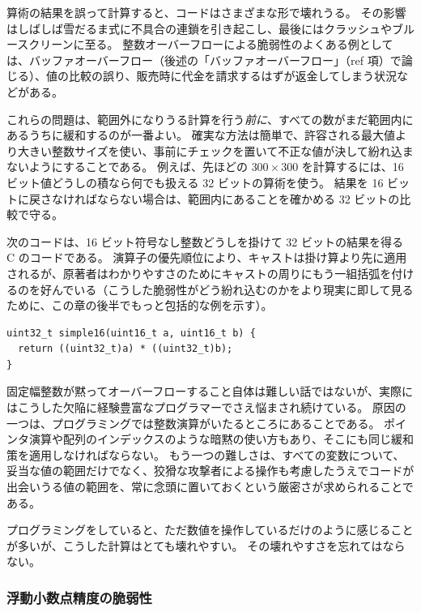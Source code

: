 \documentclass[uplatex]{jsarticle}
\def\ref#1{ref}%
\def\label#1{}%
\begin{document}
算術の結果を誤って計算すると、コードはさまざまな形で壊れうる。
その影響はしばしば雪だるま式に不具合の連鎖を引き起こし、最後にはクラッシュやブルースクリーンに至る。
整数オーバーフローによる脆弱性のよくある例としては、バッファオーバーフロー（後述の「バッファオーバーフロー」（\ref{subsec:ch9-buffer-overflow} 項）で論じる）、値の比較の誤り、販売時に代金を請求するはずが返金してしまう状況などがある。

これらの問題は、範囲外になりうる計算を行う\emph{前に}、すべての数がまだ範囲内にあるうちに緩和するのが一番よい。
確実な方法は簡単で、許容される最大値より大きい整数サイズを使い、事前にチェックを置いて不正な値が決して紛れ込まないようにすることである。
例えば、先ほどの $300 \times 300$ を計算するには、16 ビット値どうしの積なら何でも扱える 32 ビットの算術を使う。
結果を 16 ビットに戻さなければならない場合は、範囲内にあることを確かめる 32 ビットの比較で守る。

次のコードは、16 ビット符号なし整数どうしを掛けて 32 ビットの結果を得る C のコードである。
演算子の優先順位により、キャストは掛け算より先に適用されるが、原著者はわかりやすさのためにキャストの周りにもう一組括弧を付けるのを好んでいる（こうした脆弱性がどう紛れ込むのかをより現実に即して見るために、この章の後半でもっと包括的な例を示す）。

\begin{verbatim}
uint32_t simple16(uint16_t a, uint16_t b) {
  return ((uint32_t)a) * ((uint32_t)b);
}
\end{verbatim}

固定幅整数が黙ってオーバーフローすること自体は難しい話ではないが、実際にはこうした欠陥に経験豊富なプログラマーでさえ悩まされ続けている。
原因の一つは、プログラミングでは整数演算がいたるところにあることである。
ポインタ演算や配列のインデックスのような暗黙の使い方もあり、そこにも同じ緩和策を適用しなければならない。
もう一つの難しさは、すべての変数について、妥当な値の範囲だけでなく、狡猾な攻撃者による操作も考慮したうえでコードが出会いうる値の範囲を、常に念頭に置いておくという厳密さが求められることである。

プログラミングをしていると、ただ数値を操作しているだけのように感じることが多いが、こうした計算はとても壊れやすい。
その壊れやすさを忘れてはならない。

\subsubsection{浮動小数点精度の脆弱性}\label{subsec:ch9-floating-point-precision}
\end{document}

